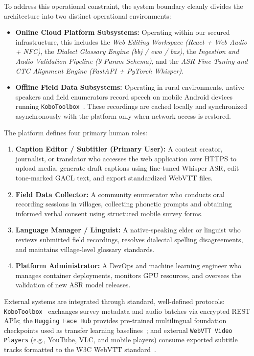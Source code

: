 \documentclass[conference]{IEEEtran}
\begin{document}
To address this operational constraint, the system boundary cleanly divides the architecture into two distinct operational environments:
\begin{itemize}
    \item \textbf{Online Cloud Platform Subsystems:} Operating within our secured infrastructure, this includes the \textit{Web Editing Workspace (React + Web Audio + NFC)}, the \textit{Dialect Glossary Engine (bbj / ewo / bas)}, the \textit{Ingestion and Audio Validation Pipeline (9-Param Schema)}, and the \textit{ASR Fine-Tuning and CTC Alignment Engine (FastAPI + PyTorch Whisper)}.
    \item \textbf{Offline Field Data Subsystems:} Operating in rural environments, native speakers and field enumerators record speech on mobile Android devices running \texttt{KoboToolbox}~\cite{kobotoolbox2024}. These recordings are cached locally and synchronized asynchronously with the platform only when network access is restored.
\end{itemize}

The platform defines four primary human roles:
\begin{enumerate}
    \item \textbf{Caption Editor / Subtitler (Primary User):} A content creator, journalist, or translator who accesses the web application over HTTPS to upload media, generate draft captions using fine-tuned Whisper ASR, edit tone-marked GACL text, and export standardized WebVTT files.
    \item \textbf{Field Data Collector:} A community enumerator who conducts oral recording sessions in villages, collecting phonetic prompts and obtaining informed verbal consent using structured mobile survey forms.
    \item \textbf{Language Manager / Linguist:} A native-speaking elder or linguist who reviews submitted field recordings, resolves dialectal spelling disagreements, and maintains village-level glossary standards.
    \item \textbf{Platform Administrator:} A DevOps and machine learning engineer who manages container deployments, monitors GPU resources, and oversees the validation of new ASR model releases.
\end{enumerate}

External systems are integrated through standard, well-defined protocols: \texttt{KoboToolbox}~\cite{kobotoolbox2024} exchanges survey metadata and audio batches via encrypted REST APIs; the \texttt{Hugging Face Hub} provides pre-trained multilingual foundation checkpoints used as transfer learning baselines~\cite{conneau2023fleurs}; and external \texttt{WebVTT Video Players} (e.g., YouTube, VLC, and mobile players) consume exported subtitle tracks formatted to the W3C WebVTT standard~\cite{w3c2019webvtt}.
\end{document}
